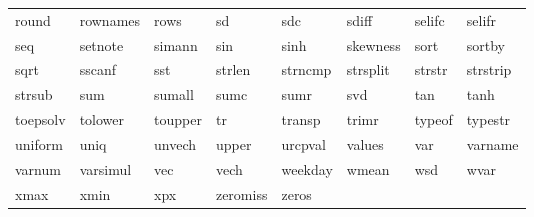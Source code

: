 \begin{tabular}{llllllll}
round & rownames & rows & sd & sdc & sdiff & selifc & selifr \\
seq & setnote & simann & sin & sinh & skewness & sort & sortby \\
sqrt & sscanf & sst & strlen & strncmp & strsplit & strstr & strstrip \\
strsub & sum & sumall & sumc & sumr & svd & tan & tanh \\
toepsolv & tolower & toupper & tr & transp & trimr & typeof & typestr \\
uniform & uniq & unvech & upper & urcpval & values & var & varname \\
varnum & varsimul & vec & vech & weekday & wmean & wsd & wvar \\
xmax & xmin & xpx & zeromiss & zeros & \\
\end{tabular}

